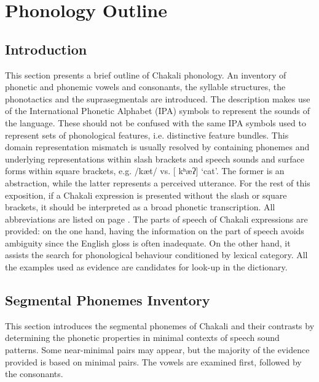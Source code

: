 
\chapter{Phonology Outline}
\label{sec:chap-phono}


\section{Introduction}
\label{sec:intro-phono}



This section presents a brief outline of Chakali phonology. An inventory of 
phonetic and phonemic vowels and consonants, the syllable structures, the 
phonotactics and the suprasegmentals are introduced.   The description makes 
use of the International Phonetic Alphabet (IPA)  symbols to represent the 
sounds of the language. These should not be confused with the same IPA symbols 
used to represent  sets of phonological features, i.e.  distinctive feature 
bundles. This domain representation mismatch is usually resolved by containing 
phonemes and underlying representations within slash brackets  and  speech 
sounds and surface forms within square brackets, e.g.  {\sls /kæt/} vs.  [{\sls 
kʰæʔ}]  `cat'. The former is an abstraction, while the 
latter 
 represents a perceived utterance.  For the rest of this exposition, if a 
Chakali 
expression is presented without the slash or  square brackets, it should be 
interpreted as a broad phonetic transcription. All  abbreviations are listed 
on page \pageref{sec-ABB}.  The parts of speech of  Chakali 
expressions are provided: on the one hand,  having the  information on the part 
of 
speech avoids ambiguity since the English gloss is often inadequate. On the 
other hand,  it assists the search for phonological behaviour conditioned by 
lexical category.  All the examples used as evidence are candidates for look-up 
in the dictionary.


\section{Segmental Phonemes Inventory}
\label{sec:seg-phon-invent}

This section introduces the segmental phonemes of Chakali and their contrasts 
by determining the phonetic properties in minimal contexts of speech sound 
patterns.  Some near-minimal pairs may appear, but the   majority of the 
evidence provided is based on  minimal pairs. The vowels are examined first, 
followed by the consonants.

